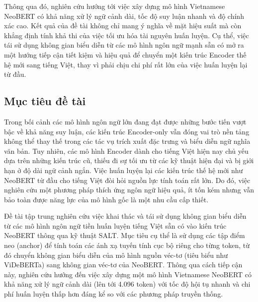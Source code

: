 \documentclass{article}[14pt]
\begin{document}
{    Thông qua đó, nghiên cứu hướng tới việc xây dựng mô hình Vietnamese NeoBERT có khả năng xử lý ngữ cảnh dài, tốc độ suy luận nhanh và độ chính xác cao. Kết quả của đề tài không chỉ mang ý nghĩa về mặt hiệu suất mà còn khẳng định tính khả thi của việc tối ưu hóa tài nguyên huấn luyện. Cụ thể, việc tái sử dụng không gian biểu diễn từ các mô hình ngôn ngữ mạnh sẵn có mở ra một hướng tiếp cận tiết kiệm và hiệu quả để chuyển một kiến trúc Encoder thế hệ mới sang tiếng Việt, thay vì phải chịu chi phí rất lớn của việc huấn luyện lại từ đầu.
  
    
    
    \subsection{Mục tiêu đề tài}
    
    Trong bối cảnh các mô hình ngôn ngữ lớn đang đạt được những bước tiến vượt bậc về khả năng suy luận, các kiến trúc Encoder-only vẫn đóng vai trò nền tảng không thể thay thế trong các tác vụ trích xuất đặc trưng và biểu diễn ngữ nghĩa văn bản. Tuy nhiên, các mô hình Encoder dành cho tiếng Việt hiện nay chủ yếu dựa trên những kiến trúc cũ, thiếu đi sự tối ưu từ các kỹ thuật hiện đại và bị giới hạn ở độ dài ngữ cảnh ngắn. Việc huấn luyện lại các kiến trúc thế hệ mới như NeoBERT từ đầu cho tiếng Việt đòi hỏi nguồn lực tính toán rất lớn. Do đó, việc nghiên cứu một phương pháp thích ứng ngôn ngữ hiệu quả, ít tốn kém nhưng vẫn bảo toàn được năng lực của mô hình gốc là một nhu cầu cấp thiết.

    Đề tài tập trung nghiên cứu việc khai thác và tái sử dụng không gian biểu diễn từ các mô hình ngôn ngữ tiền huấn luyện tiếng Việt sẵn có vào kiến trúc NeoBERT thông qua kỹ thuật SALT. Mục tiêu cụ thể là sử dụng các tập điểm neo (anchor) để tính toán các ánh xạ tuyến tính cục bộ riêng cho từng token, từ đó chuyển không gian biểu diễn của mô hình nguồn véc-tơ (tiêu biểu như ViDeBERTa) sang không gian véc-tơ của NeoBERT. Thông qua cách tiếp cận này, nghiên cứu hướng đến việc xây dựng một mô hình Vietnamese NeoBERT có khả năng xử lý ngữ cảnh dài (lên tới 4.096 token) với tốc độ hội tụ nhanh và chi phí huấn luyện thấp hơn đáng kể so với các phương pháp truyền thống.
    
}
\end{document}
